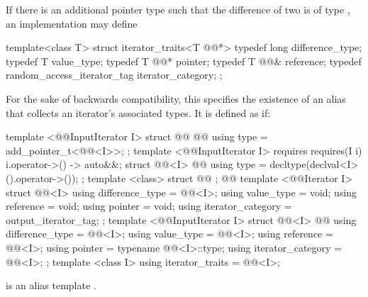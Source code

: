 \begin{removedblock}
\pnum
\enternote
If there is an additional pointer type
such that the difference of two
is of type
,
an implementation may define

\begin{codeblock}
  template<class T> struct iterator_traits<T @@*> {
    typedef long difference_type;
    typedef T value_type;
    typedef T @@* pointer;
    typedef T @@& reference;
    typedef random_access_iterator_tag iterator_category;
  };
\end{codeblock}
\exitnote
\end{removedblock}

\begin{addedblock}
\pnum
For the sake of backwards compatibility, this  specifies the existence of an 
alias that collects an iterator's associated types. It is defined as if:

%
\begin{codeblock}
  template <@@InputIterator I> struct @@ {        @\newtxt{// \expos}@
    using type = add_pointer_t<@@<I>>;
  };
  template <@@InputIterator I>
    requires requires(I i) { { i.operator->() } -> auto&&; }
  struct @@<I> {                                    @\newtxt{// \expos}@
    using type = decltype(declval<I>().operator->());
  };
  template <class> struct @@ { };                @\newtxt{// \expos}@
  template <@@Iterator I> struct @@<I> {
    using difference_type = @@<I>;
    using value_type = void;
    using reference = void;
    using pointer = void;
    using iterator_category = output_iterator_tag;
  };
  template <@@InputIterator I> struct @@<I> {  @\newtxt{// \expos}@
    using difference_type = @@<I>;
    using value_type = @@<I>;
    using reference = @@<I>;
    using pointer = typename @@<I>::type;
    using iterator_category = @@<I>;
  };
  template <class I>
    using iterator_traits = @@<I>;
\end{codeblock}

\pnum
\enternote
{} is an alias template
.
\exitnote

\end{addedblock}

